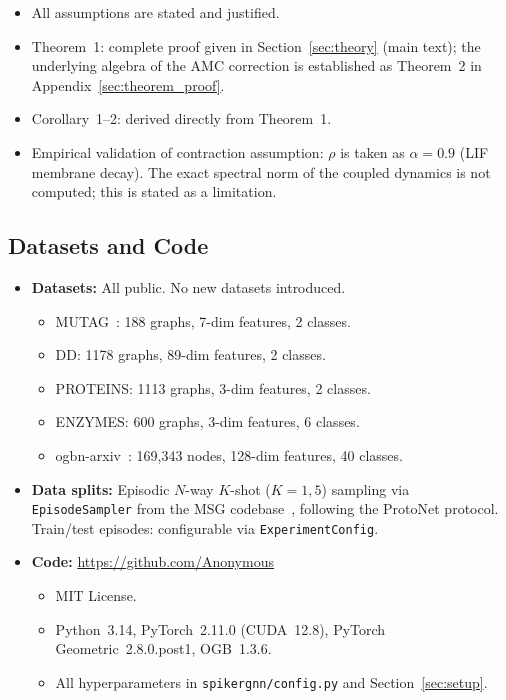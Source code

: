 \documentclass[a4paper,fleqn]{cas-dc}
\begin{document}
\begin{itemize}
    \item[\checkmark] All assumptions are stated and justified.
    \item[\checkmark] Theorem~1: complete proof given in Section~\ref{sec:theory} (main text); the underlying algebra of the AMC correction is established as Theorem~2 in Appendix~\ref{sec:theorem_proof}.
    \item[\checkmark] Corollary~1--2: derived directly from Theorem~1.
    \item[-] Empirical validation of contraction assumption: $\rho$ is taken as $\alpha=0.9$ (LIF membrane decay). The exact spectral norm of the coupled dynamics is not computed; this is stated as a limitation.
\end{itemize}

\subsection*{Datasets and Code}

\begin{itemize}
    \item \textbf{Datasets:} All public. No new datasets introduced.
    \begin{itemize}
        \item MUTAG~\citep{MUTAG}: 188 graphs, 7-dim features, 2 classes.
        \item DD: 1178 graphs, 89-dim features, 2 classes.
        \item PROTEINS: 1113 graphs, 3-dim features, 2 classes.
        \item ENZYMES: 600 graphs, 3-dim features, 6 classes.
        \item ogbn-arxiv~\citep{hu2020open}: 169,343 nodes, 128-dim features, 40 classes.
    \end{itemize}
    \item \textbf{Data splits:} Episodic $N$-way $K$-shot ($K{=}1{,}5$) sampling via \texttt{EpisodeSampler} from the MSG codebase~\citep{Sun24MSG}, following the ProtoNet protocol. Train/test episodes: configurable via \texttt{ExperimentConfig}.
    \item \textbf{Code:} \url{https://github.com/Anonymous}
    \begin{itemize}
        \item MIT License.
        \item Python~3.14, PyTorch~2.11.0 (CUDA~12.8), PyTorch Geometric~2.8.0.post1, OGB~1.3.6.
        \item All hyperparameters in \texttt{spikergnn/config.py} and Section~\ref{sec:setup}.
    \end{itemize}
\end{itemize}
\end{document}
